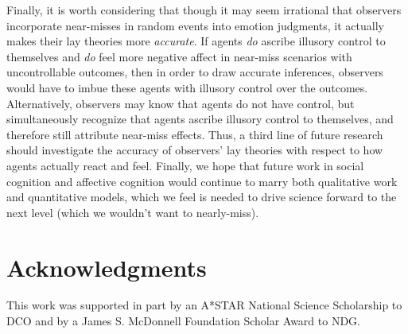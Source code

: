 \documentclass[10pt,letterpaper]{article}
\begin{document}
	Finally, it is worth considering that though it may seem irrational that observers incorporate near-misses in random events into emotion judgments, it actually makes their lay theories more \textit{accurate}. If agents \textit{do} ascribe illusory control to themselves and \textit{do} feel more negative affect in near-miss scenarios with uncontrollable outcomes, then in order to draw accurate inferences, observers would have to imbue these agents with illusory control over the outcomes. Alternatively, observers may know that agents do not have control, but simultaneously recognize that agents ascribe illusory control to themselves, and therefore still attribute near-miss effects. Thus, a third line of future research should investigate the accuracy of observers' lay theories with respect to how agents actually react and feel. Finally, we hope that future work in social cognition and affective cognition would continue to marry both qualitative work and quantitative models, which we feel is needed to drive science forward to the next level (which we wouldn't want to nearly-miss).
	
	


\section{Acknowledgments}

This work was supported in part by an A*STAR National Science Scholarship to DCO and by a James S. McDonnell Foundation Scholar Award to NDG.




\setlength{\bibleftmargin}{.125in}
\setlength{\bibindent}{-\bibleftmargin}
\end{document}
